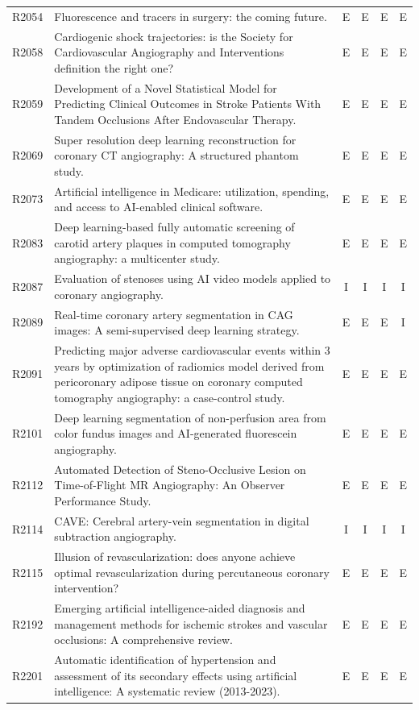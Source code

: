 \begin{longtable}{@{}l p{8.6cm} c c c c@{}}
R2054 & Fluorescence and tracers in surgery: the coming future. & E & E & E & E \\
R2058 & Cardiogenic shock trajectories: is the Society for Cardiovascular Angiography and Interventions definition the right one? & E & E & E & E \\
R2059 & Development of a Novel Statistical Model for Predicting Clinical Outcomes in Stroke Patients With Tandem Occlusions After Endovascular Therapy. & E & E & E & E \\
R2069 & Super resolution deep learning reconstruction for coronary CT angiography: A structured phantom study. & E & E & E & E \\
R2073 & Artificial intelligence in Medicare: utilization, spending, and access to AI-enabled clinical software. & E & E & E & E \\
R2083 & Deep learning-based fully automatic screening of carotid artery plaques in computed tomography angiography: a multicenter study. & E & E & E & E \\
R2087 & Evaluation of stenoses using AI video models applied to coronary angiography. & I & I & I & I \\
R2089 & Real-time coronary artery segmentation in CAG images: A semi-supervised deep learning strategy. & E & E & E & I \\
R2091 & Predicting major adverse cardiovascular events within 3 years by optimization of radiomics model derived from pericoronary adipose tissue on coronary computed tomography angiography: a case-control study. & E & E & E & E \\
R2101 & Deep learning segmentation of non-perfusion area from color fundus images and AI-generated fluorescein angiography. & E & E & E & E \\
R2112 & Automated Detection of Steno-Occlusive Lesion on Time-of-Flight MR Angiography: An Observer Performance Study. & E & E & E & E \\
R2114 & CAVE: Cerebral artery-vein segmentation in digital subtraction angiography. & I & I & I & I \\
R2115 & Illusion of revascularization: does anyone achieve optimal revascularization during percutaneous coronary intervention? & E & E & E & E \\
R2192 & Emerging artificial intelligence-aided diagnosis and management methods for ischemic strokes and vascular occlusions: A comprehensive review. & E & E & E & E \\
R2201 & Automatic identification of hypertension and assessment of its secondary effects using artificial intelligence: A systematic review (2013-2023). & E & E & E & E \\

\end{longtable}
